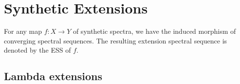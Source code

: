\section{Synthetic Extensions} \label{sec:synext}


For any map $f:X\rightarrow Y$ of synthetic spectra, we have the induced morphism of converging spectral sequences. The resulting extension spectral sequence is denoted by the ESS of $f$.

\subsection{Lambda extensions}


